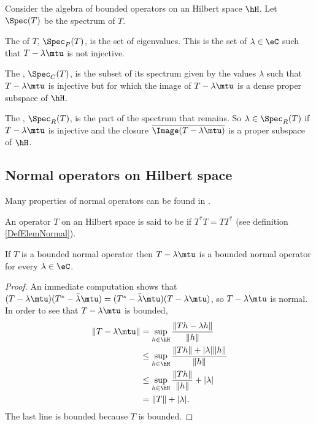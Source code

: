 \begin{definition}
    Consider the algebra of bounded operators on an Hilbert space \( \hH\). Let \( \Spec(T)\) be the spectrum of \( T\). 
    
    The  of \( T\), \( \Spec_P(T)\), is the set of eigenvalues. This is the set of \( \lambda\in\eC\) such that \( T-\lambda\mtu\) is not injective.

    The , \( \Spec_C(T)\), is the subset of its spectrum given by the values \( \lambda\) such that \( T-\lambda\mtu\) is injective but for which the image of \( T-\lambda\mtu\) is a dense proper subspace of \( \hH\).

    The , $\Spec_R(T)$, is the part of the spectrum that remains. So \( \lambda\in\Spec_R(T)\) if \( T-\lambda\mtu\) is injective and the closure \( \overline{ \Image(T-\lambda\mtu) }\) is a proper subspace of \( \hH\).
\end{definition}


\subsection{Normal operators on Hilbert space}

Many properties of normal operators can be found in \cite{AndrewGreen}.

An operator \( T\) on an Hilbert space is said to be  if \( T^*T=TT^*\) (see definition \ref{DefElemNormal}). 

\begin{proposition}
    If \( T\) is a bounded normal operator then \( T-\lambda\mtu\) is a bounded normal operator for every \( \lambda\in\eC\).
\end{proposition}

\begin{proof}
    An immediate computation shows that \( (T-\lambda\mtu)(T^*-\bar\lambda\mtu)=(T^*-\bar\lambda\mtu)(T-\lambda\mtu)\), so \( T-\lambda\mtu\) is normal. In order to see that \( T-\lambda\mtu\) is bounded,
    \begin{subequations}
        \begin{align}
            \| T-\lambda\mtu \|&=\sup_{h\in\hH}\frac{ \| Th-\lambda h \| }{ \| h \| }\\
            &\leq\sup_{h\in\hH}\frac{ \| Th \|+| \lambda|\| h \| }{ \| h \| }\\
            &\leq\sup_{h\in\hH}\frac{ \| Th \| }{ \| h \| }+| \lambda |\\
            &=\| T \|+| \lambda |.
        \end{align}
    \end{subequations}
    The last line is bounded because \( T\) is bounded.
\end{proof}

